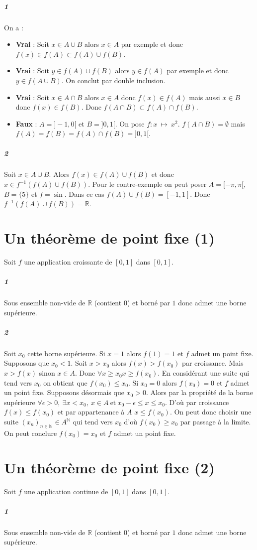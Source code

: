 \documentclass[10pt,a4paper]{article}
\begin{document}
\subparagraph{1} On a :
\begin{itemize}
\item \textbf{Vrai} : Soit $x \in A \cup B$ alors $x \in A$ par exemple et donc $f(x) \in f(A) \subset f(A) \cup f(B)$.
\item \textbf{Vrai} : Soit $y \in f(A) \cup f(B)$ alors $y \in f(A)$ par exemple et donc $y \in f(A \cup B)$. On conclut par double inclusion.
\item \textbf{Vrai} : Soit $x \in A \cap B$ alors $x \in A$ donc $f(x) \in f(A)$ mais aussi $x \in B$ donc $f(x) \in f(B)$. Donc $f(A\cap B) \subset f(A) \cap f(B)$.
\item \textbf{Faux} : $A = ]-1,0[$ et $B=]0,1[$. On pose $f:x \ \mapsto \ x^2$. $f(A \cap B) = \emptyset$ mais $f(A) = f(B) = f(A) \cap f(B) = ]0,1[$.
\end{itemize}

\subparagraph{2}Soit $x \in A \cup B$. Alors $f(x) \in f(A) \cup f(B)$ et donc $x \in f^{-1}(f(A) \cup f(B))$. Pour le contre-exemple on peut poser $A = [-\pi,\pi[$, $B = \lbrace 5 \rbrace$ et $f = \sin$. Dans ce cas $f(A) \cup f(B) = [-1,1]$. Donc $f^{-1}(f(A) \cup f(B)) = \mathbb{R}$. 

\section{Un théorème de point fixe (1)}
Soit $f$ une application croissante de $[0,1]$ dans $[0,1]$.
\subparagraph{1}Sous ensemble non-vide de $\mathbb{R}$ (contient $0$) et borné par $1$ donc admet une borne supérieure.

\subparagraph{2}Soit $x_0$ cette borne supérieure. Si $x=1$ alors $f(1)=1$ et $f$ admet un point fixe. Supposons que $x_0 <1$. Soit $x>x_0$ alors $f(x) > f(x_0)$ par croissance. Mais $x>f(x)$ sinon $x \in A$. Donc $\forall x\ge x_0 x \ge f(x_0)$. En considérant une suite qui tend vers $x_0$ on obtient que $f(x_0) \le x_0$. Si $x_0=0$ alors $f(x_0)=0$ et $f$ admet un point fixe. Supposons désormais que $x_0>0$. Alors par la propriété de la borne supérieure $\forall \epsilon>0, \ \exists x<x_0, \ x\in A \ \text{et} \ x_0 - \epsilon \le x \le x_0$. D'où par croissance $f(x) \le f(x_0)$ et par appartenance à $A$ $x\le f(x_0)$. On peut donc choisir une suite $(x_n)_{n \in \mathbb{N}} \in A^{\mathbb{N}} $ qui tend vers $x_0$ d'où $f(x_0) \ge x_0$ par passage à la limite. On peut conclure $f(x_0) = x_0$ et $f$ admet un point fixe.

\section{Un théorème de point fixe (2)}
Soit $f$ une application continue de $[0,1]$ dans $[0,1]$.
\subparagraph{1}Sous ensemble non-vide de $\mathbb{R}$ (contient $0$) et borné par $1$ donc admet une borne supérieure.
\end{document}
